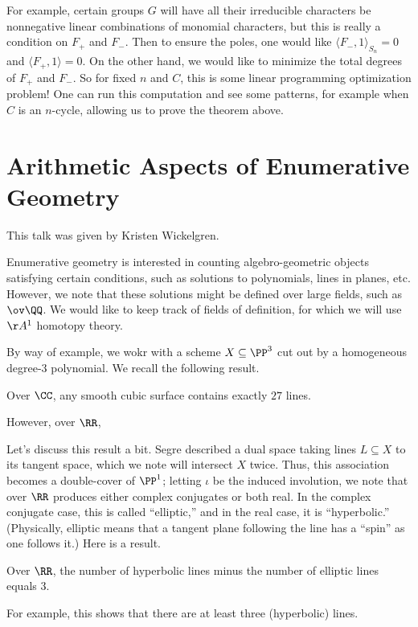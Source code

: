 \documentclass{article}
\begin{document}
For example, certain groups $G$ will have all their irreducible characters be nonnegative linear combinations of monomial characters, but this is really a condition on $F_+$ and $F_-$. Then to ensure the poles, one would like $\langle F_-,1\rangle_{S_n}=0$ and $\langle F_+,1\rangle=0$. On the other hand, we would like to minimize the total degrees of $F_+$ and $F_-$. So for fixed $n$ and $C$, this is some linear programming optimization problem! One can run this computation and see some patterns, for example when $C$ is an $n$-cycle, allowing us to prove the theorem above.



\section{Arithmetic Aspects of Enumerative Geometry}
This talk was given by Kristen Wickelgren.

Enumerative geometry is interested in counting algebro-geo\-metric objects satisfying certain conditions, such as solutions to polynomials, lines in planes, etc. However, we note that these solutions might be defined over large fields, such as $\ov\QQ$. We would like to keep track of fields of definition, for which we will use $\AA^1$ homotopy theory.

By way of example, we wokr with a scheme $X\subseteq\PP^3$ cut out by a homogeneous degree-$3$ polynomial. We recall the following result.
\begin{theorem}
	Over $\CC$, any smooth cubic surface contains exactly $27$ lines.
\end{theorem}
\begin{remark}
	However, over $\RR$, 
\end{remark}
Let's discuss this result a bit. Segre described a dual space taking lines $L\subseteq X$ to its tangent space, which we note will intersect $X$ twice. Thus, this association becomes a double-cover of $\PP^1$; letting $\iota$ be the induced involution, we note that over $\RR$ produces either complex conjugates or both real. In the complex conjugate case, this is called ``elliptic,'' and in the real case, it is ``hyperbolic.'' (Physically, elliptic means that a tangent plane following the line has a ``spin'' as one follows it.) Here is a result.
\begin{theorem}
	Over $\RR$, the number of hyperbolic lines minus the number of elliptic lines equals $3$.
\end{theorem}
For example, this shows that there are at least three (hyperbolic) lines.
\end{document}
